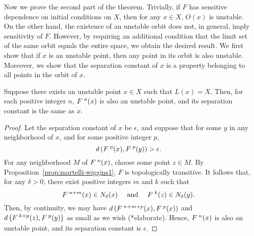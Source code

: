 \documentclass[10pt,draft,twoside]{book}
\begin{document}
Now we prove the second part of the theorem.
Trivially, if $F$ has sensitive dependence on initial conditions on $X$, then for any $x \in X$, $O(x)$ is unstable.
On the other hand, the existence of an unstable orbit does not, in general, imply sensitivity of $F$.
However, by requiring an additional condition that the limit set of the same orbit equals the entire space, we obtain the desired result.
We first show that if $x$ is an unstable point, then any point in its orbit is also unstable.
Moreover, we show that the separation constant of $x$ is a property belonging to all points in the orbit of $x$.
\begin{proposition}
  Suppose there exists an unstable point $x \in X$ such that $L(x) = X$.
  Then, for each positive integer $n$, $F^{\;n}(x)$ is also an unstable point, and its separation constant is the same as $x$.
  \label{prop:unstable-orbit}
  \begin{proof}
    Let the separation constant of $x$ be $\epsilon$, and suppose that for some $y$ in any neighborhood of $x$, and for some positive integer $p$,
    \begin{equation*}
      d\left( F^{\;p}(x), F^{\;p}(y) \right) > \epsilon.
    \end{equation*}
    For any neighborhood $M$ of $F^{\;n}(x)$, choose some point $z \in M$.
    By Proposition~\ref{prop:martelli-wiggins1}, $F$ is topologically transitive.
    It follows that, for any $\delta > 0$, there exist positive integers $m$ and $k$ such that
    \begin{equation*}
      F^{\;n+m}(x) \in N_{\delta}(x)
      \quad \mbox{ and } \quad
      F^{\;k}(z) \in N_{\delta}(y).
    \end{equation*}
    Then, by continuity, we may have $d\left( F^{\;n+m+p}(x), F^{\;p}(x) \right)$ and $d\left( F^{\;k+p}(z), F^{\;p}(y) \right)$ as small as we wish (*elaborate).
    Hence, $F^{\;n}(x)$ is also an unstable point, and its separation constant is $\epsilon$.
  \end{proof}
\end{proposition}
\end{document}
